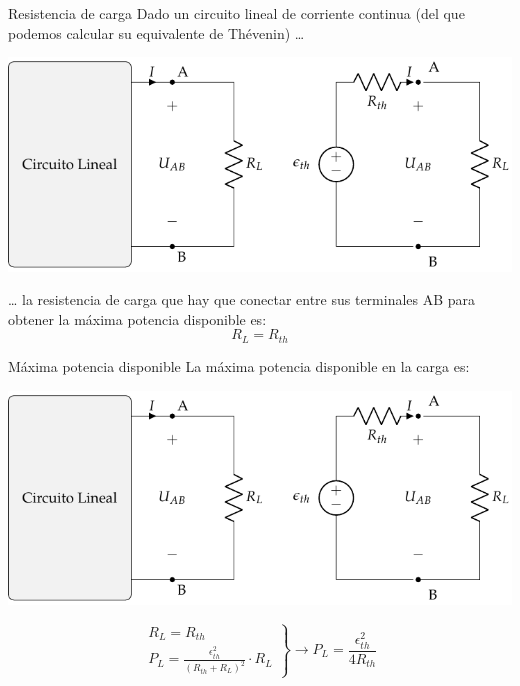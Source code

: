 \documentclass[aspectratio=169, usenames,svgnames,dvipsnames]{beamer}
\begin{document}
\begin{frame}[label={sec:orgc2e0e31}]{Resistencia de carga}
Dado un circuito lineal de corriente continua (del que podemos calcular su equivalente de Thévenin) \ldots{}
\begin{center}
\includegraphics[height=0.45\textheight]{../figs/EquivalenteThevenin_R.pdf}
\end{center}

\ldots{} la resistencia de carga que hay que conectar entre sus terminales AB para obtener la máxima potencia disponible es:
\[
  \boxed{R_L = R_{th}}
\]
\end{frame}

\begin{frame}[label={sec:org48c82a7}]{Máxima potencia disponible}
La máxima potencia disponible en la carga es:
\begin{center}
\includegraphics[height=0.45\textheight]{../figs/EquivalenteThevenin_R.pdf}
\end{center}

\begin{equation*}
  \left.
    \begin{matrix}
      R_L = R_{th}\\
      P_L = \frac{\epsilon^2_{th}}{(R_{th} + R_L)^2} \cdot R_L
    \end{matrix} \right\}\rightarrow
  \boxed{P_L = \frac{\epsilon^2_{th}}{4 R_{th}}}
\end{equation*}
\end{frame}
\end{document}
